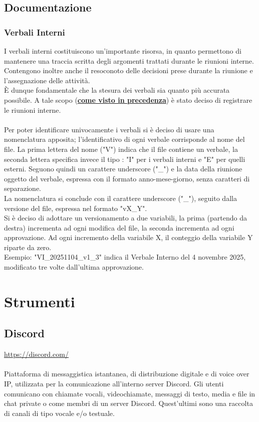 \documentclass[a4paper,12pt]{article}
\begin{document}
\subsection{Documentazione}

\subsubsection{Verbali Interni}
I verbali interni costituiscono un'importante risorsa, in quanto permettono di mantenere una traccia scritta degli argomenti trattati durante le riunioni interne. Contengono inoltre anche il resoconoto delle decisioni prese durante la riunione e l'assegnazione delle attività.\\
È dunque fondamentale che la stesura dei verbali sia quanto più accurata possibile. A tale scopo (\textbf{\underline{\hyperref[subsec:riunioniInterne]{come visto in precedenza}}}) è stato deciso di registrare le riunioni interne.\\\\
Per poter identificare univocamente i verbali si è deciso di usare una nomenclatura apposita; l'identificativo di ogni verbale corrisponde al nome del file. La prima lettera del nome ("V") indica che il file contiene un verbale, la seconda lettera specifica invece il tipo : "I" per i verbali interni e "E" per quelli esterni. Seguono quindi un carattere underscore ("\_") e la data della riunione oggetto del verbale, espressa con il formato anno-mese-giorno, senza caratteri di separazione.\\
La nomenclatura si conclude con il carattere underscore ("\_"), seguito dalla versione del file, espressa nel formato "vX\_Y".\\
Si è deciso di adottare un versionamento a due variabili, la prima (partendo da destra) incrementa ad ogni modifica del file, la seconda incrementa ad ogni approvazione. Ad ogni incremento della variabile X, il conteggio della variabile Y riparte da zero.\\
Esempio: "VI\_20251104\_v1\_3" indica il Verbale Interno del 4 novembre 2025, modificato tre volte dall'ultima approvazione.



\newpage
\section{Strumenti}

\subsection{Discord} \label{strumenti:discord}
\underline{\url{https://discord.com/}} \\\\
Piattaforma di messaggistica istantanea, di distribuzione digitale e di voice over IP, utilizzata per la comunicazione all'interno server Discord.
Gli utenti comunicano con chiamate vocali, videochiamate, messaggi di testo, media e file in chat private o come membri di un server Discord. Quest'ultimi sono una raccolta di canali di tipo vocale e/o testuale. 
\end{document}
